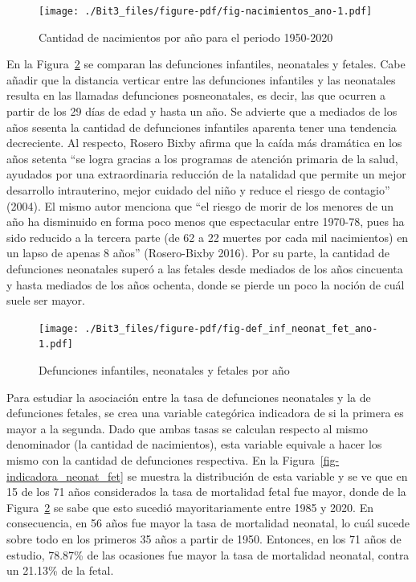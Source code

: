 \documentclass[
  letterpaper,
  onepage,
  openany]{report}
\begin{document}
\begin{figure}[H]

{\centering \texttt{[image: ./Bit3\_files/figure-pdf/fig-nacimientos\_ano-1.pdf]}

}

\caption{\label{fig-nacimientos_ano}Cantidad de nacimientos por año para
el periodo 1950-2020}

\end{figure}

En la Figura~\ref{fig-def_inf_neonat_fet_ano} se comparan las
defunciones infantiles, neonatales y fetales. Cabe añadir que la
distancia verticar entre las defunciones infantiles y las neonatales
resulta en las llamadas defunciones posneonatales, es decir, las que
ocurren a partir de los 29 días de edad y hasta un año. Se advierte que
a mediados de los años sesenta la cantidad de defunciones infantiles
aparenta tener una tendencia decreciente. Al respecto, Rosero Bixby
afirma que la caída más dramática en los años setenta ``se logra gracias
a los programas de atención primaria de la salud, ayudados por una
extraordinaria reducción de la natalidad que permite un mejor desarrollo
intrauterino, mejor cuidado del niño y reduce el riesgo de contagio''
(2004). El mismo autor menciona que ``el riesgo de morir de los menores
de un año ha disminuido en forma poco menos que espectacular entre
1970-78, pues ha sido reducido a la tercera parte (de 62 a 22 muertes
por cada mil nacimientos) en un lapso de apenas 8 años'' (Rosero-Bixby
2016). Por su parte, la cantidad de defunciones neonatales superó a las
fetales desde mediados de los años cincuenta y hasta mediados de los
años ochenta, donde se pierde un poco la noción de cuál suele ser mayor.

\begin{figure}[H]

{\centering \texttt{[image: ./Bit3\_files/figure-pdf/fig-def\_inf\_neonat\_fet\_ano-1.pdf]}

}

\caption{\label{fig-def_inf_neonat_fet_ano}Defunciones infantiles,
neonatales y fetales por año}

\end{figure}

Para estudiar la asociación entre la tasa de defunciones neonatales y la
de defunciones fetales, se crea una variable categórica indicadora de si
la primera es mayor a la segunda. Dado que ambas tasas se calculan
respecto al mismo denominador (la cantidad de nacimientos), esta
variable equivale a hacer los mismo con la cantidad de defunciones
respectiva. En la Figura~\ref{fig-indicadora_neonat_fet} se muestra la
distribución de esta variable y se ve que en 15 de los 71 años
considerados la tasa de mortalidad fetal fue mayor, donde de la
Figura~\ref{fig-def_inf_neonat_fet_ano} se sabe que esto sucedió
mayoritariamente entre 1985 y 2020. En consecuencia, en 56 años fue
mayor la tasa de mortalidad neonatal, lo cuál sucede sobre todo en los
primeros 35 años a partir de 1950. Entonces, en los 71 años de estudio,
78.87\% de las ocasiones fue mayor la tasa de mortalidad neonatal,
contra un 21.13\% de la fetal.
\end{document}
